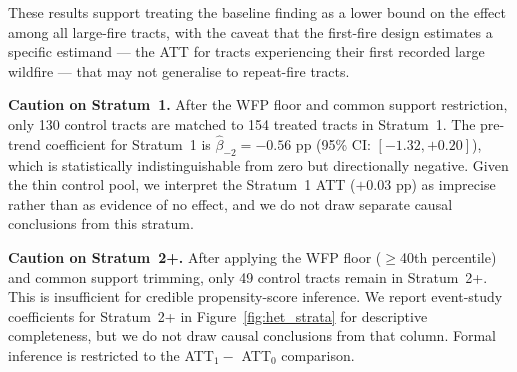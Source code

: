 \documentclass[12pt]{article}
\begin{document}
These results support treating the baseline finding as a lower bound on the effect
among all large-fire tracts, with the caveat that the first-fire design estimates
a specific estimand --- the ATT for tracts experiencing their first recorded large
wildfire --- that may not generalise to repeat-fire tracts.

\medskip
\noindent\textbf{Caution on Stratum~1.}
After the WFP floor and common support restriction, only 130 control tracts are
matched to 154 treated tracts in Stratum~1.
The pre-trend coefficient for Stratum~1 is $\hat{\beta}_{-2} = -0.56$ pp
(95\% CI: $[-1.32, +0.20]$), which is statistically indistinguishable from zero
but directionally negative.
Given the thin control pool, we interpret the Stratum~1 ATT ($+0.03$ pp) as imprecise
rather than as evidence of no effect, and we do not draw separate causal conclusions
from this stratum.

\medskip
\noindent\textbf{Caution on Stratum~2+.}
After applying the WFP floor ($\geq$40th percentile) and common support trimming,
only 49 control tracts remain in Stratum~2+.
This is insufficient for credible propensity-score inference.
We report event-study coefficients for Stratum~2+ in Figure~\ref{fig:het_strata}
for descriptive completeness, but we do not draw causal conclusions from that column.
Formal inference is restricted to the ATT$_1 -$ ATT$_0$ comparison.
\end{document}
